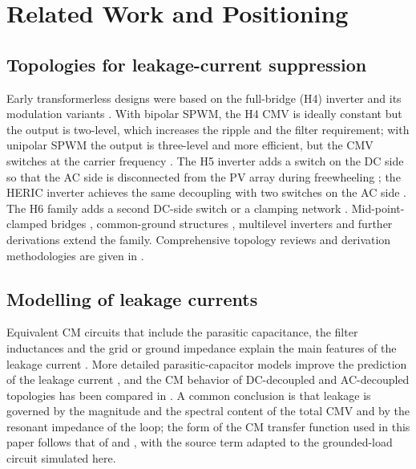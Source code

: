 \section{Related Work and Positioning}
\label{sec:related}

\subsection{Topologies for leakage-current suppression}
Early transformerless designs were based on the full-bridge (H4) inverter and its modulation variants \cite{Kjaer2005,Gonzalez2007}. With bipolar SPWM, the H4 CMV is ideally constant but the output is two-level, which increases the ripple and the filter requirement; with unipolar SPWM the output is three-level and more efficient, but the CMV switches at the carrier frequency \cite{Gonzalez2007,Gubia2007}. The H5 inverter adds a switch on the DC side so that the AC side is disconnected from the PV array during freewheeling \cite{Victor2008}; the HERIC inverter achieves the same decoupling with two switches on the AC side \cite{Schmidt2003}. The H6 family adds a second DC-side switch or a clamping network \cite{Zhang2014,Yu2011,Islam2015}. Mid-point-clamped bridges \cite{Kerekes2011}, common-ground structures \cite{Salem2021}, multilevel inverters \cite{Gonzalez2008} and further derivations \cite{Xiao2011} extend the family. Comprehensive topology reviews and derivation methodologies are given in \cite{Li2015,Khan2020,Kibria2023,Kolodziejski2023}.

\subsection{Modelling of leakage currents}
Equivalent CM circuits that include the parasitic capacitance, the filter inductances and the grid or ground impedance explain the main features of the leakage current \cite{Gubia2007,Lopez2007,Lopez2010}. More detailed parasitic-capacitor models improve the prediction of the leakage current \cite{Chen2016}, and the CM behavior of DC-decoupled and AC-decoupled topologies has been compared in \cite{Sundar2016}. A common conclusion is that leakage is governed by the magnitude and the spectral content of the total CMV and by the resonant impedance of the loop; the form of the CM transfer function used in this paper follows that of \cite{Gubia2007} and \cite{Shrestha2025}, with the source term adapted to the grounded-load circuit simulated here.

